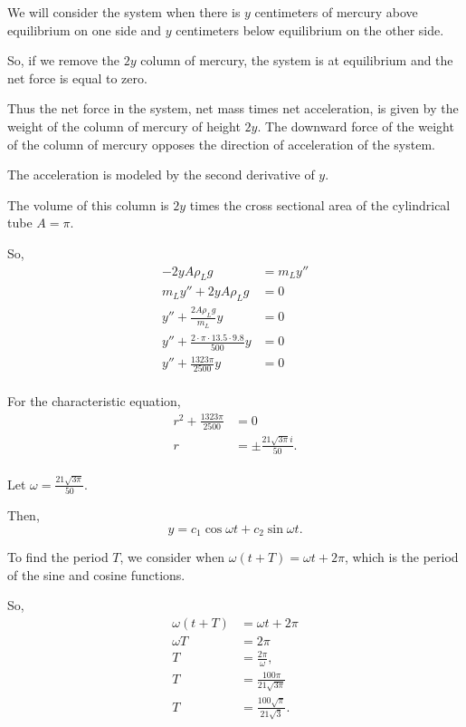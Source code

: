 \documentclass[../hw8]{subfiles}
\begin{document}
We will consider the system when there is $y$ centimeters of mercury above equilibrium on one side and $y$ centimeters below equilibrium on the other side. 

So, if we remove the $2y$ column of mercury, the system is at equilibrium and the net force is equal to zero.

Thus the net force in the system, net mass times net acceleration, is given by the weight of the column of mercury of height $2y$. The downward force of the weight of the column of mercury opposes the direction of acceleration of the system.

The acceleration is modeled by the second derivative of $y$.

The volume of this column is $2y$ times the cross sectional area of the cylindrical tube $A=\pi$.

So,
\begin{align*}
    -2yA\rho_L g&= m_L y'' \\
    m_L y''+2yA\rho_L g&= 0 \\
    y'' + \frac{2A\rho_L g}{m_L}y&= 0 \\
    y'' + \frac{2\cdot\pi\cdot13.5\cdot9.8}{500}y &= 0 \\
    y'' + \frac{1323\pi}{2500}y &= 0 \\
\end{align*}

For the characteristic equation,
\begin{align*}
    r^2+\frac{1323\pi}{2500}&=0\\
    r&=\pm\frac{21\sqrt{3\pi}i}{50}.\\
\end{align*}

Let $\omega=\frac{21\sqrt{3\pi}}{50}$.

Then, \[y=c_1\cos{\omega t}+c_2\sin{\omega t}.\]

To find the period $T$, we consider when $\omega (t+T)=\omega t + 2\pi$, which is the period of the sine and cosine functions.

So,
\begin{align*}
    \omega (t+T)&=\omega t + 2\pi\\
    \omega T &= 2\pi\\
    T &= \frac{2\pi}{\omega},\\
    T &= \frac{100\pi}{21\sqrt{3\pi}}\\
    T &= \frac{100\sqrt{\pi}}{21\sqrt{3}}.
\end{align*}
\end{document}
